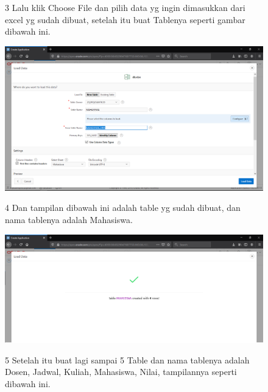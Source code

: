 \begin{enumerate}
\begin{figure}[!htbp]
\item[3]Lalu klik Choose File dan pilih data yg ingin dimasukkan dari excel yg sudah dibuat, setelah itu buat Tablenya seperti gambar dibawah ini.

    \begin{center}
\includegraphics[scale=0.2]{figures/4.png}
    \caption{\textit{}}
        \end{center}
\label{gambar}
\end{figure}

\begin{figure}
\item[4]Dan tampilan dibawah ini adalah table yg sudah dibuat, dan nama tablenya adalah Mahasiswa.

    \begin{center}
\includegraphics[scale=0.2]{figures/5.png}
    \caption{\textit{}}
        \end{center}
\label{gambar}
\end{figure}

\begin{figure}
\item[5]Setelah itu buat lagi sampai 5 Table dan nama tablenya adalah Dosen, Jadwal, Kuliah, Mahasiswa, Nilai, tampilannya seperti dibawah ini.


\end{figure}
\end{enumerate}

